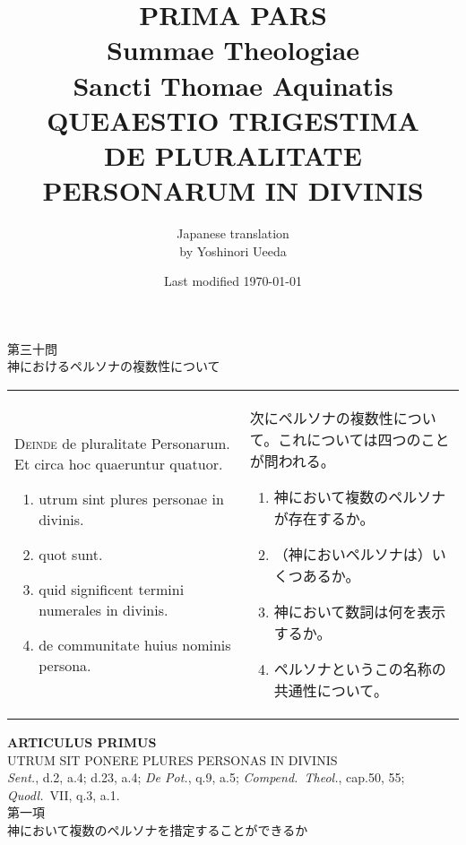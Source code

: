 \documentclass[10pt]{jsarticle} %
\title{{\bf PRIMA PARS}\\{\HUGE Summae Theologiae}\\Sancti Thomae
Aquinatis\\{\sffamily QUEAESTIO TRIGESTIMA}\\DE PLURALITATE PERSONARUM
IN DIVINIS}
\author{Japanese translation\\by Yoshinori {\sc Ueeda}}
\date{Last modified \today}
\begin{document}
\maketitle

\begin{center}
{\Large 第三十問\\神におけるペルソナの複数性について}
\end{center}


\begin{longtable}{p{21em}p{21em}}

{\Huge D}{\scshape einde} de pluralitate Personarum. Et circa hoc quaeruntur
quatuor. 

\begin{enumerate}
 \item utrum sint plures personae in divinis.
 \item quot sunt.
 \item quid significent termini numerales in divinis.
 \item de communitate huius nominis persona.
\end{enumerate}


&



次にペルソナの複数性について。これについては四つのことが問われる。

\begin{enumerate}
 \item 神において複数のペルソナが存在するか。
 \item （神においペルソナは）いくつあるか。
 \item 神において数詞は何を表示するか。
 \item ペルソナというこの名称の共通性について。
\end{enumerate}

\end{longtable}


\newpage



\begin{center}
{\Large {\bf ARTICULUS PRIMUS}}\\
{\large UTRUM SIT PONERE PLURES PERSONAS IN DIVINIS}\\
{\footnotesize {\itshape Sent.}, d.2, a.4; d.23, a.4; {\itshape De
 Pot.}, q.9, a.5; {\itshape Compend.~Theol.}, cap.50, 55; {\itshape
 Quodl.}~VII, q.3, a.1.}\\
{\Large 第一項\\神において複数のペルソナを措定することができるか}
\end{center}
\end{document}
